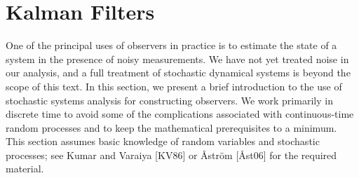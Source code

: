 \chapter{Kalman Filters}
\label{kalman_filters}

One of the principal uses of observers in practice is to estimate the state of a
system in the presence of noisy measurements. We have not yet treated noise in our
analysis, and a full treatment of stochastic dynamical systems is beyond the scope
of this text. In this section, we present a brief introduction to the use of stochastic
systems analysis for constructing observers. We work primarily in discrete time to
avoid some of the complications associated with continuous-time random processes
and to keep the mathematical prerequisites to a minimum. This section assumes
basic knowledge of random variables and stochastic processes; see Kumar and
Varaiya [KV86] or Åström [Åst06] for the required material.

